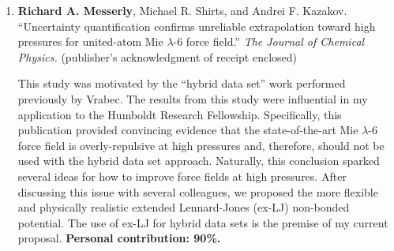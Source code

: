 \documentclass[12pt]{article}
\begin{document}
\begin{enumerate}
\item \textbf{Richard A. Messerly}, Michael R. Shirts, and Andrei F. Kazakov. ``Uncertainty quantification confirms unreliable extrapolation toward high pressures for united-atom Mie $\lambda$-6 force field.'' \textit{The Journal of Chemical Physics.} (publisher's acknowledgment of receipt enclosed)

This study was motivated by the ``hybrid data set'' work performed previously by Vrabec. The results from this study were influential in my application to the Humboldt Research Fellowship. Specifically, this publication provided convincing evidence that the state-of-the-art Mie $\lambda$-6 force field is overly-repulsive at high pressures and, therefore, should not be used with the hybrid data set approach. Naturally, this conclusion sparked several ideas for how to improve force fields at high pressures. After discussing this issue with several colleagues, we proposed the more flexible and physically realistic extended Lennard-Jones (ex-LJ) non-bonded potential. The use of ex-LJ for hybrid data sets is the premise of my current proposal. \textbf{Personal contribution: 90\%.} 




\end{enumerate}
\end{document}
